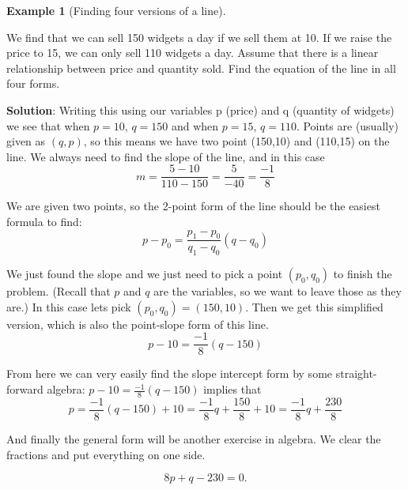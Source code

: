 \documentclass[10pt,]{book}
\newcommand{\terminology}[1]{\textbf{#1}}
\theoremstyle{plain}
\theoremstyle{definition}
\newtheorem{example}[theorem]{Example}
\theoremstyle{definition}
\begin{document}
\begin{example}[Finding four versions of a line]\label{example-2}

 We find that we can sell 150 widgets a day if we sell them at \textdollar{}10.  If we raise the price to \textdollar{}15, we can only sell 110 widgets a day.  Assume that there is a linear relationship between price and quantity sold.  Find the equation of the line in all four forms.%
\par

\terminology{Solution}:  Writing this using our variables p (price) and q (quantity of widgets) we see that when \(p = 10\), \(q = 150\) and when \(p = 15\), \(q = 110\).  Points are (usually) given as \((q,p)\), so this means we have two point (150,10) and (110,15) on the line. 
We always need to find the slope of the line, and in this case 
\begin{equation*}m=  \frac{5-10}{110-150}=  \frac{5}{-40}= \frac{-1}{8}\end{equation*}

We are given two points, so the 2-point form of the line should be the easiest formula to find: 
\begin{equation*}p-p_0=\frac{p_1-p_0}{q_1-q_0 }(q-q_0)\end{equation*}

We just found the slope and we just need to pick a point \((p_0,q_0)\) to finish the problem. (Recall that \(p\) and \(q\) are the variables, so we want to leave those as they are.) In this case lets pick \((p_0,q_0)= (150,10)\). Then we get this simplified version, which is also the point-slope form of this line.
\begin{equation*}p-10=\frac{-1}{8}(q-150)\end{equation*}

From here we can very easily find the slope intercept form by some straight-forward algebra:
\(p-10=\frac{-1}{8}(q-150)\) implies that 
\begin{equation*}p=\frac{-1}{8} (q-150)+10=  \frac{-1}{8} q+  \frac{150}{8}+10=  \frac{-1}{8} q+\frac{230}{8}\end{equation*}
%
\par

And finally the general form will be another exercise in algebra. We clear the fractions and put everything on one side.

\begin{equation*}8p+q-230=0.\end{equation*}%
\end{example}
\end{document}
